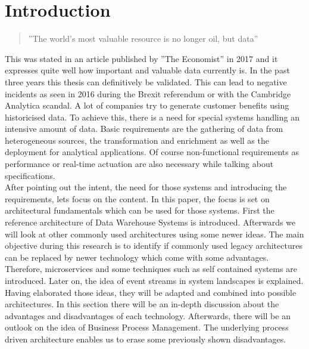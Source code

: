 \section{Introduction}
\label{sec:intro}
\begin{quote}
    ''The world’s most valuable resource is no longer oil, but data'' \cite{dataIsOil}
\end{quote}
This was stated in an article published by ''The Economist'' in 2017 and it expresses quite well how important and valuable data currently is. In the past three years this thesis can definitively be validated. This can lead to negative incidents as seen in 2016 during the Brexit referendum or with the Cambridge Analytica scandal. A lot of companies try to generate customer benefits using historicised data.\newline
To achieve this, there is a need for special systems handling an intensive amount of data. Basic requirements are the gathering of data from heterogeneous sources, the transformation and enrichment as well as the deployment for analytical applications. Of course non-functional requirements as performance or real-time actuation are also necessary while talking about specifications.\newline
\\
After pointing out the intent, the need for those systems and introducing the requirements, lets focus on the content. In this paper, the focus is set on architectural fundamentals which can be used for those systems. First the reference architecture of Data Warehouse Systems is introduced. Afterwards we will look at other commonly used architectures using some newer ideas.
The main objective during this research is to identify if commonly used legacy architectures can be replaced by newer technology which come with some advantages.
\newline
Therefore, microservices and some techniques such as self contained systems are introduced. Later on, the idea of event streams in system landscapes is explained.\newline
Having elaborated those ideas, they will be adapted and combined into possible architectures. In this section there will be an in-depth discussion about the advantages and disadvantages of each technology.\newline
Afterwards, there will be an outlook on the idea of Business Process Management. The underlying process driven architecture enables us to erase some previously shown disadvantages.\newline
